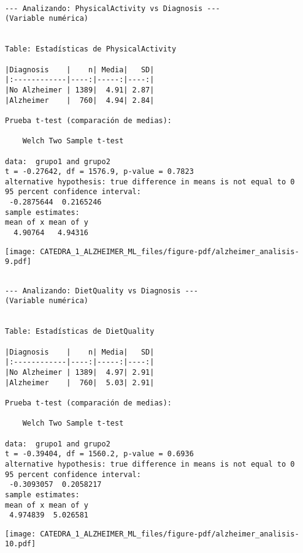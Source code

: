 \documentclass[
  letterpaper,
  DIV=11,
  numbers=noendperiod]{scrartcl}
\begin{document}
\begin{verbatim}

--- Analizando: PhysicalActivity vs Diagnosis ---
(Variable numérica)


Table: Estadísticas de PhysicalActivity

|Diagnosis    |    n| Media|   SD|
|:------------|----:|-----:|----:|
|No Alzheimer | 1389|  4.91| 2.87|
|Alzheimer    |  760|  4.94| 2.84|

Prueba t-test (comparación de medias):

    Welch Two Sample t-test

data:  grupo1 and grupo2
t = -0.27642, df = 1576.9, p-value = 0.7823
alternative hypothesis: true difference in means is not equal to 0
95 percent confidence interval:
 -0.2875644  0.2165246
sample estimates:
mean of x mean of y 
  4.90764   4.94316 
\end{verbatim}

\begin{center}
\texttt{[image: CATEDRA\_1\_ALZHEIMER\_ML\_files/figure-pdf/alzheimer\_analisis-9.pdf]}
\end{center}

\begin{verbatim}

--- Analizando: DietQuality vs Diagnosis ---
(Variable numérica)


Table: Estadísticas de DietQuality

|Diagnosis    |    n| Media|   SD|
|:------------|----:|-----:|----:|
|No Alzheimer | 1389|  4.97| 2.91|
|Alzheimer    |  760|  5.03| 2.91|

Prueba t-test (comparación de medias):

    Welch Two Sample t-test

data:  grupo1 and grupo2
t = -0.39404, df = 1560.2, p-value = 0.6936
alternative hypothesis: true difference in means is not equal to 0
95 percent confidence interval:
 -0.3093057  0.2058217
sample estimates:
mean of x mean of y 
 4.974839  5.026581 
\end{verbatim}

\begin{center}
\texttt{[image: CATEDRA\_1\_ALZHEIMER\_ML\_files/figure-pdf/alzheimer\_analisis-10.pdf]}
\end{center}
\end{document}
